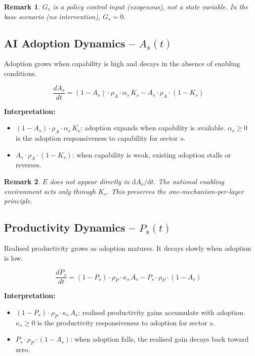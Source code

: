 \documentclass[11pt,a4paper]{article}
\newtheorem{remark}{Remark}
\begin{document}
\begin{remark}
$G_s$ is a policy control input (exogenous), not a state variable. In the base scenario (no intervention), $G_s = 0$.
\end{remark}

\subsection{AI Adoption Dynamics -- \texorpdfstring{$A_s(t)$}{As(t)}}

Adoption grows when capability is high and decays in the absence of enabling conditions.

\begin{equation}
\boxed{
\frac{dA_s}{dt}
= (1 - A_s)\cdot\rho_A\cdot\alpha_s\, K_s
- A_s\cdot\rho_A\cdot(1 - K_s)
}
\label{eq:As}
\end{equation}

\textbf{Interpretation:}
\begin{itemize}
  \item $(1 - A_s)\cdot\rho_A\cdot\alpha_s\, K_s$: adoption expands when capability is available. $\alpha_s \geq 0$ is the adoption responsiveness to capability for sector $s$.
  \item $A_s\cdot\rho_A\cdot(1 - K_s)$: when capability is weak, existing adoption stalls or reverses.
\end{itemize}

\begin{remark}
$E$ does not appear directly in $\mathrm{d}A_s/\mathrm{d}t$. The national enabling environment acts \emph{only through} $K_s$. This preserves the one-mechanism-per-layer principle.
\end{remark}

\subsection{Productivity Dynamics -- \texorpdfstring{$P_s(t)$}{Ps(t)}}

Realised productivity grows as adoption matures. It decays slowly when adoption is low.

\begin{equation}
\boxed{
\frac{dP_s}{dt}
= (1 - P_s)\cdot\rho_P\cdot\kappa_s\, A_s
- P_s\cdot\rho_P\cdot(1 - A_s)
}
\label{eq:Ps}
\end{equation}

\textbf{Interpretation:}
\begin{itemize}
  \item $(1 - P_s)\cdot\rho_P\cdot\kappa_s\, A_s$: realised productivity gains accumulate with adoption. $\kappa_s \geq 0$ is the productivity responsiveness to adoption for sector $s$.
  \item $P_s\cdot\rho_P\cdot(1 - A_s)$: when adoption falls, the realised gain decays back toward zero.
\end{itemize}
\end{document}
